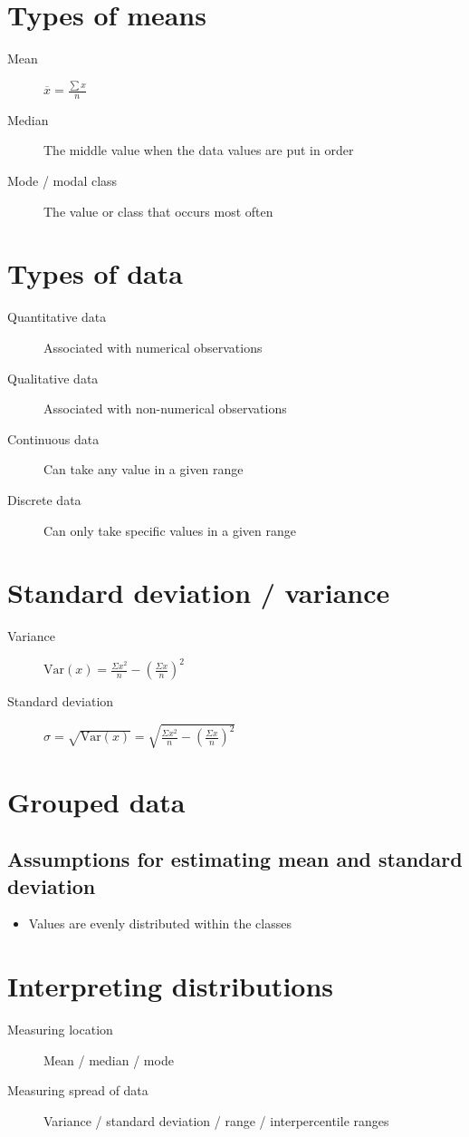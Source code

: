 \section{Types of means}
\begin{description}
    \item[Mean] $\overline{x}=\frac{\sum x}{n}$
    \item[Median] The middle value when the data values are put in order
    \item[Mode / modal class] The value or class that occurs most often
\end{description}

\section{Types of data}
\begin{description}
    \item[Quantitative data] Associated with numerical observations
    \item[Qualitative data] Associated with non-numerical observations
    \item[Continuous data] Can take any value in a given range
    \item[Discrete data] Can only take specific values in a given range
\end{description}

\section{Standard deviation / variance}
\begin{description}
    \item[Variance] $\mathrm{Var}(x)=\frac{\Sigma x^2}{n} - (\frac{\Sigma x}{n})^2$
    \item[Standard deviation] $\sigma=\sqrt{\mathrm{Var}(x)}=\sqrt{\frac{\Sigma x^2}{n} - (\frac{\Sigma x}{n})^2}$
\end{description}

\section{Grouped data}
\subsection{Assumptions for estimating mean and standard deviation}
\begin{itemize}
    \item Values are evenly distributed within the classes
\end{itemize}

\section{Interpreting distributions}
\begin{description}
    \item[Measuring location] Mean / median / mode
    \item[Measuring spread of data] Variance / standard deviation / range / interpercentile ranges
\end{description}
